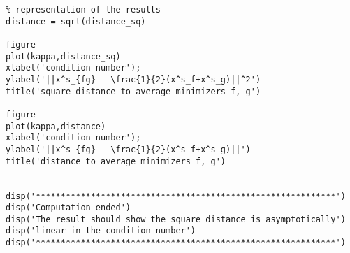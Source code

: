 \documentclass[11pt,a4paper]{article}
\begin{document}
\begin{lstlisting}
% representation of the results
distance = sqrt(distance_sq)

figure
plot(kappa,distance_sq)
xlabel('condition number');
ylabel('||x^s_{fg} - \frac{1}{2}(x^s_f+x^s_g)||^2')
title('square distance to average minimizers f, g')

figure
plot(kappa,distance)
xlabel('condition number');
ylabel('||x^s_{fg} - \frac{1}{2}(x^s_f+x^s_g)||')
title('distance to average minimizers f, g')


disp('************************************************************')
disp('Computation ended')
disp('The result should show the square distance is asymptotically')
disp('linear in the condition number')
disp('************************************************************')

\end{lstlisting}
\clearpage

{}
\end{document}
